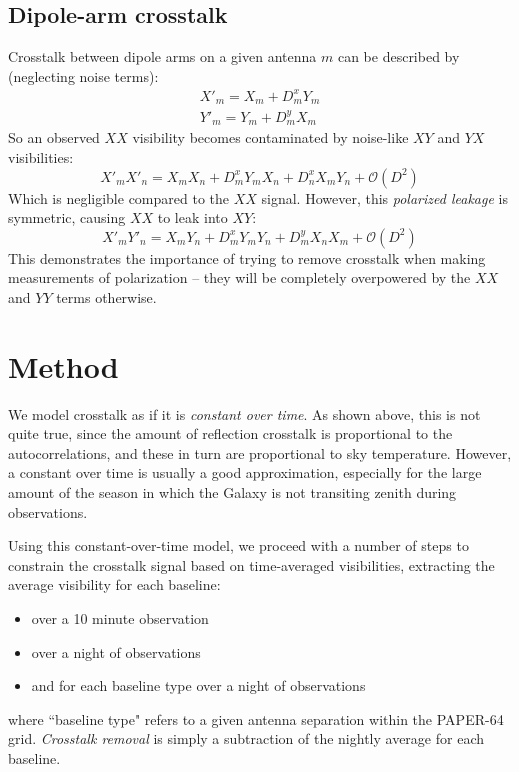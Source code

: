 \documentclass[10pt,a4paper,notitlepage]{article}
\begin{document}
\subsection{Dipole-arm crosstalk}
Crosstalk between dipole arms on a given antenna $m$ can be described by (neglecting noise terms):
\begin{align*}
X'_m = X_m + D^x_mY_m\\
Y'_m = Y_m + D^y_mX_m
\end{align*}
\noindent So an observed $XX$ visibility becomes contaminated by noise-like $XY$ and $YX$ visibilities:
\begin{equation}
X'_mX'_n = X_mX_n + D^x_mY_mX_n + D^x_nX_mY_n  + \mathcal{O}(D^2)
\end{equation}
\noindent Which is negligible compared to the $XX$ signal. However, this \textit{polarized leakage} is symmetric, causing $XX$ to leak into $XY$:
\begin{equation}
X'_mY'_n=X_mY_n + D^x_mY_mY_n + D^y_mX_nX_m + \mathcal{O}(D^2)
\end{equation}
\noindent This demonstrates the importance of trying to remove crosstalk when making measurements of polarization -- they will be completely overpowered by the $XX$ and $YY$ terms otherwise.

\section{Method}

We model crosstalk as if it is \textit{constant over time}. As shown above, this is not quite true, since the amount of reflection crosstalk is proportional to the autocorrelations, and these in turn are proportional to sky temperature. However, a constant over time is usually a good approximation, especially for the large amount of the season in which the Galaxy is not transiting zenith during observations.

Using this constant-over-time model, we proceed with a number of steps to constrain the crosstalk signal based on time-averaged visibilities, extracting the average visibility for each baseline:
\begin{itemize}
\item  over a 10 minute observation
\item  over a night of observations
\item  and for each baseline type over a night of observations
\end{itemize}
\noindent where ``baseline type" refers to a given antenna separation within the PAPER-64 grid. \textit{Crosstalk removal} is simply a subtraction of the nightly average for each baseline.
\end{document}
